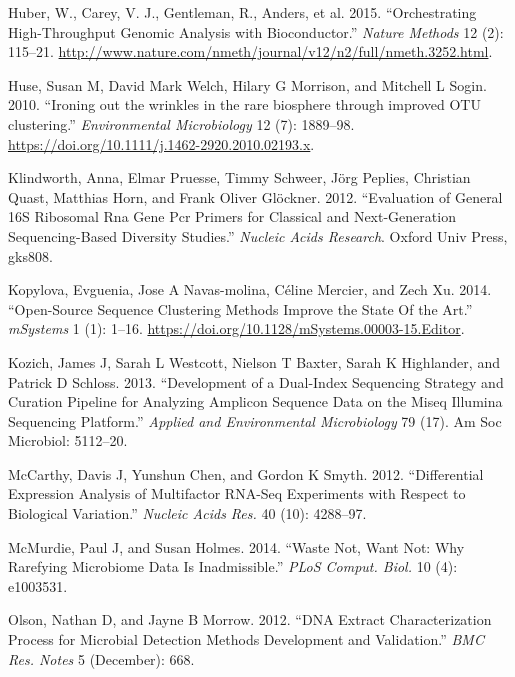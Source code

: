 \documentclass[smallextended]{svjour3}       %
\begin{document}
\leavevmode\hypertarget{ref-Bioconductor}{}%
Huber, W., Carey, V. J., Gentleman, R., Anders, et al. 2015.
``Orchestrating High-Throughput Genomic Analysis with Bioconductor.''
\emph{Nature Methods} 12 (2): 115--21.
\url{http://www.nature.com/nmeth/journal/v12/n2/full/nmeth.3252.html}.

\leavevmode\hypertarget{ref-Huse2010}{}%
Huse, Susan M, David Mark Welch, Hilary G Morrison, and Mitchell L
Sogin. 2010. ``Ironing out the wrinkles in the rare biosphere through
improved OTU clustering.'' \emph{Environmental Microbiology} 12 (7):
1889--98. \url{https://doi.org/10.1111/j.1462-2920.2010.02193.x}.

\leavevmode\hypertarget{ref-klindworth2012evaluation}{}%
Klindworth, Anna, Elmar Pruesse, Timmy Schweer, Jörg Peplies, Christian
Quast, Matthias Horn, and Frank Oliver Glöckner. 2012. ``Evaluation of
General 16S Ribosomal Rna Gene Pcr Primers for Classical and
Next-Generation Sequencing-Based Diversity Studies.'' \emph{Nucleic
Acids Research}. Oxford Univ Press, gks808.

\leavevmode\hypertarget{ref-Kopylova2014}{}%
Kopylova, Evguenia, Jose A Navas-molina, Céline Mercier, and Zech Xu.
2014. ``Open-Source Sequence Clustering Methods Improve the State Of the
Art.'' \emph{mSystems} 1 (1): 1--16.
\url{https://doi.org/10.1128/mSystems.00003-15.Editor}.

\leavevmode\hypertarget{ref-kozich2013development}{}%
Kozich, James J, Sarah L Westcott, Nielson T Baxter, Sarah K Highlander,
and Patrick D Schloss. 2013. ``Development of a Dual-Index Sequencing
Strategy and Curation Pipeline for Analyzing Amplicon Sequence Data on
the Miseq Illumina Sequencing Platform.'' \emph{Applied and
Environmental Microbiology} 79 (17). Am Soc Microbiol: 5112--20.

\leavevmode\hypertarget{ref-McCarthy2012}{}%
McCarthy, Davis J, Yunshun Chen, and Gordon K Smyth. 2012.
``Differential Expression Analysis of Multifactor RNA-Seq Experiments
with Respect to Biological Variation.'' \emph{Nucleic Acids Res.} 40
(10): 4288--97.

\leavevmode\hypertarget{ref-McMurdie2014}{}%
McMurdie, Paul J, and Susan Holmes. 2014. ``Waste Not, Want Not: Why
Rarefying Microbiome Data Is Inadmissible.'' \emph{PLoS Comput. Biol.}
10 (4): e1003531.

\leavevmode\hypertarget{ref-Olson2012}{}%
Olson, Nathan D, and Jayne B Morrow. 2012. ``DNA Extract
Characterization Process for Microbial Detection Methods Development and
Validation.'' \emph{BMC Res. Notes} 5 (December): 668.
\end{document}
